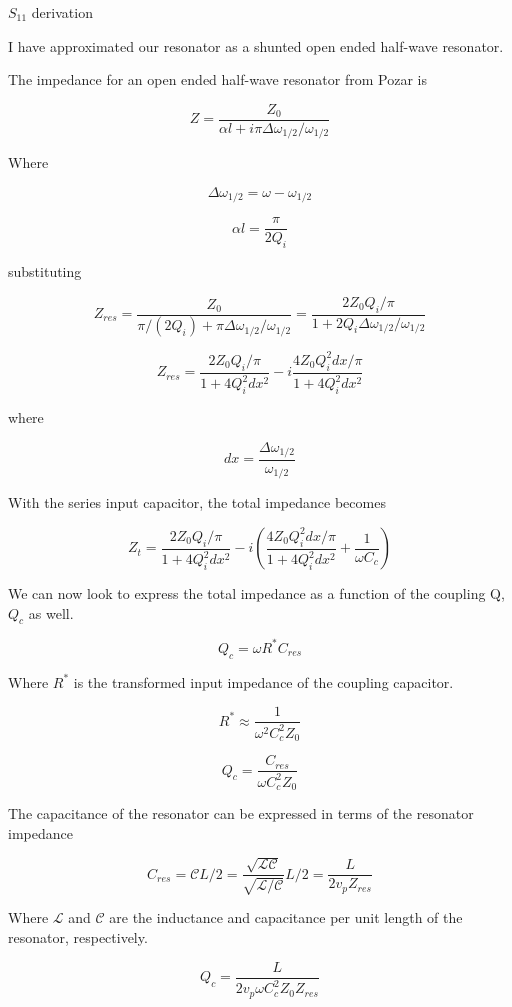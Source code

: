 \documentclass[12pt]{article}
\begin{document}
\setlength{\parindent}{0 pt}

\begin{center}
$S_{11}$ derivation
\end{center}
I have approximated our resonator as a shunted open ended half-wave resonator.

The impedance for an open ended half-wave resonator from Pozar is

\[
Z = \frac{Z_0}{\alpha l + i \pi \Delta \omega_{1/2}/\omega_{1/2}}
\]

Where

\[
\Delta \omega_{1/2} = \omega - \omega_{1/2}
\]

\[
\alpha l = \frac{\pi}{2Q_i}
\]

substituting

\[
Z_{res} = \frac{Z_0}{\pi/(2Q_i) + \pi \Delta \omega_{1/2}/\omega_{1/2}} = \frac{2 Z_0 Q_i / \pi}{1 + 2 Q_i \Delta \omega_{1/2} / \omega_{1/2}} 
\]

\[
Z_{res} = \frac{2 Z_0 Q_i/\pi}{1 + 4Q_i^2dx^2} - i \frac{4 Z_0 Q_i^2 dx/\pi}{1 + 4Q_i^2 dx^2}
\]

where

\[
dx = \frac{\Delta \omega_{1/2}}{\omega_{1/2}}
\]

With the series input capacitor, the total impedance becomes

\[
Z_t =  \frac{2 Z_0 Q_i/\pi}{1 + 4Q_i^2dx^2} - i \left( \frac{4 Z_0 Q_i^2 dx/\pi}{1 + 4Q_i^2 dx^2} + \frac{1}{\omega C_c}\right)
\]

We can now look to express the total impedance as a function of the coupling Q, $Q_c$ as well.

\[
Q_c = \omega R^* C_{res}
\]

Where $R^*$ is the transformed input impedance of the coupling capacitor.

\[
R^* \approx \frac{1}{\omega^2 C_c^2 Z_0} 
\]

\[
Q_c = \frac{C_{res}}{\omega C_c^2 Z_0}
\]

The capacitance of the resonator can be expressed in terms of the resonator impedance

\[
C_{res} = {\mathcal C} L/2 = \frac{\sqrt{ {\mathcal L} {\mathcal C}}}{ \sqrt{ {\mathcal L} / {\mathcal C} }} L/2 = \frac{L}{ 2 v_p Z_{res}}
\]

Where ${\mathcal L}$ and ${\mathcal C}$ are the inductance and capacitance per unit length of the resonator, respectively.

\[
Q_c = \frac{L}{2 v_p \omega C_c^2 Z_0 Z_{res}}
\]
\end{document}
